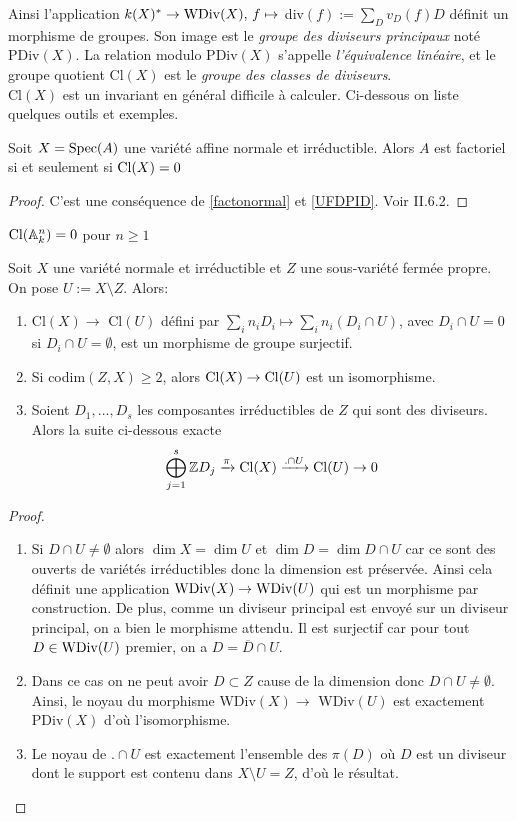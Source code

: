 Ainsi l'application $k(X)^*\rightarrow \operatorname{WDiv}(X),\, f\mapsto $ div$(f):=\sum_D v_D(f)D$ définit un morphisme de groupes. Son image est le \textit{groupe des diviseurs principaux} noté PDiv$(X)$. La relation modulo PDiv$(X)$ s'appelle \textit{l'équivalence linéaire}, et le groupe quotient Cl$(X)$ est le \textit{groupe des classes de diviseurs}.\\
Cl$(X)$ est un invariant en général difficile à calculer. Ci-dessous on liste quelques outils et exemples.


\begin{prop}\label{AffUFDClgTrifial}
Soit $X=\operatorname{Spec}(A)$ une variété affine normale et irréductible. Alors $A$ est factoriel si et seulement si $\operatorname{Cl}(X)=0$
\end{prop}
\begin{proof}
C'est une conséquence de \ref{factonormal} et \ref{UFDPID}. Voir \cite{Hartshorne} II.6.2.
\end{proof}

\begin{cor}
$\operatorname{Cl}(\mathbb{A} ^n_k)=0$ pour $n\geq 1$
\end{cor}

\begin{thm}\label{divexactseq}
Soit $X$ une variété normale et irréductible et $Z$ une sous-variété fermée propre. On pose $U:=X\setminus Z$. Alors:
\begin{enumerate}
\item Cl$(X)\rightarrow$ Cl$(U)$ défini par $\sum_i n_iD_i\mapsto \sum_i n_i(D_i\cap U)$, avec $D_i\cap U = 0$ si $D_i\cap U=\emptyset $, est un morphisme de groupe surjectif.
\item Si codim$(Z,X)\geq 2$, alors $\operatorname{Cl}(X)\rightarrow \operatorname{Cl}(U)$ est un isomorphisme.
\item Soient $D_1,..., D_s$ les composantes irréductibles de $Z$ qui sont des diviseurs. Alors la suite ci-dessous exacte $$\bigoplus_{j=1}^s \mathbb{Z} D_j \xrightarrow{\pi} \operatorname{Cl}(X) \xrightarrow{.\cap U} \operatorname{Cl}(U) \rightarrow 0 $$
\end{enumerate}
\end{thm}
\begin{proof}
\begin{enumerate}
\item Si $D\cap U\neq \emptyset$ alors $\dim X=\dim U$ et $\dim D=\dim D\cap U$ car ce sont des ouverts de variétés irréductibles donc la dimension est préservée. Ainsi cela définit une application $\operatorname{WDiv}(X)\rightarrow \operatorname{WDiv}(U)$ qui est un morphisme par construction. De plus, comme un diviseur principal est envoyé sur un diviseur principal, on a bien le morphisme attendu. Il est surjectif car pour tout $D\in\operatorname{WDiv}(U)$ premier, on a $D=\overline{D}\cap U$.
\item Dans ce cas on ne peut avoir $D\subset Z$ cause de la dimension donc $D\cap U\neq \emptyset$. Ainsi, le noyau du morphisme WDiv$(X)\rightarrow$ WDiv$(U)$ est exactement PDiv$(X)$ d'où l'isomorphisme.
\item Le noyau de $.\cap U$ est exactement l'ensemble des $\pi(D)$ où $D$ est un diviseur dont le support est contenu dans $X\setminus U=Z$, d'où le résultat.
\end{enumerate}
\end{proof}

